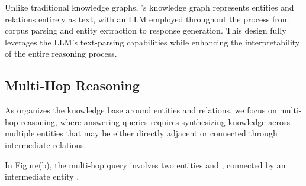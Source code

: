 

Unlike traditional knowledge graphs, \rag's knowledge graph represents entities and relations entirely as text, with an LLM employed throughout the process from corpus parsing and entity extraction to response generation. This design fully leverages the LLM's text-parsing capabilities while enhancing the interpretability of the entire reasoning process.

\subsection{Multi-Hop Reasoning}
\label{multihop_questions}
As \rag organizes the knowledge base around entities and relations, we focus on multi-hop reasoning, where answering queries requires synthesizing knowledge across multiple entities that may be either directly adjacent or connected through intermediate relations.


\begin{mtbox}{}
\begin{example}
In Figure(b), the multi-hop query  involves two entities  and , connected by an intermediate entity .
\end{example}
\end{mtbox}

